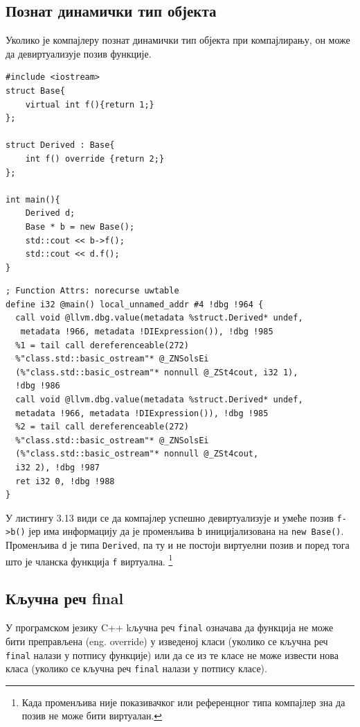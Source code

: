\documentclass[12pt,oneside]{memoir}
\begin{document}
 \subsection{Познат динамички тип објекта}
 Уколико је компајлеру познат динамички тип објекта при компајлирању, он може 
 да девиртуализује позив функције.
 
 \begin{lstlisting}[frame=single,caption={Пример са познатим динамичким типом објекта }, captionpos=b]
#include <iostream>
struct Base{
    virtual int f(){return 1;}
};

struct Derived : Base{
    int f() override {return 2;}
};

int main(){
    Derived d;
    Base * b = new Base();
    std::cout << b->f();
    std::cout << d.f();  
}
 \end{lstlisting}
 
 \begin{lstlisting}[frame=single,caption={Међурепрезентација програма из листинга 3.12}, captionpos=b]
; Function Attrs: norecurse uwtable
define i32 @main() local_unnamed_addr #4 !dbg !964 {
  call void @llvm.dbg.value(metadata %struct.Derived* undef,
   metadata !966, metadata !DIExpression()), !dbg !985
  %1 = tail call dereferenceable(272) 
  %"class.std::basic_ostream"* @_ZNSolsEi
  (%"class.std::basic_ostream"* nonnull @_ZSt4cout, i32 1), 
  !dbg !986
  call void @llvm.dbg.value(metadata %struct.Derived* undef, 
  metadata !966, metadata !DIExpression()), !dbg !985
  %2 = tail call dereferenceable(272) 
  %"class.std::basic_ostream"* @_ZNSolsEi
  (%"class.std::basic_ostream"* nonnull @_ZSt4cout, 
  i32 2), !dbg !987
  ret i32 0, !dbg !988
}
 \end{lstlisting}
 
 У листингу 3.13 види се да компајлер успешно девиртуализује и умеће позив 
 \texttt{f->b()} јер има информацију да је променљива \texttt{b} иницијализована на 
 \texttt{new Base()}.
 Променљива \texttt{d} је типа \texttt{Derived}, па ту и не постоји виртуелни позив
  и поред тога што је чланска функција \texttt{f} виртуална.
 \footnote{Када променљива није показивачког или референцног типа 
  компајлер зна да позив не може бити виртуалан.}
 
 \subsection{Кључна реч final}
 У програмском језику C++ kључна реч \texttt{final} означава да функција не може бити 
 преправљена (eng. override) у изведеној класи (уколико се кључна реч \texttt{final} налази у потпису функције)
 или да се из те класе не може извести нова класа (уколико се кључна реч \texttt{final}
 налази у потпису класе).
	 
\end{document}
